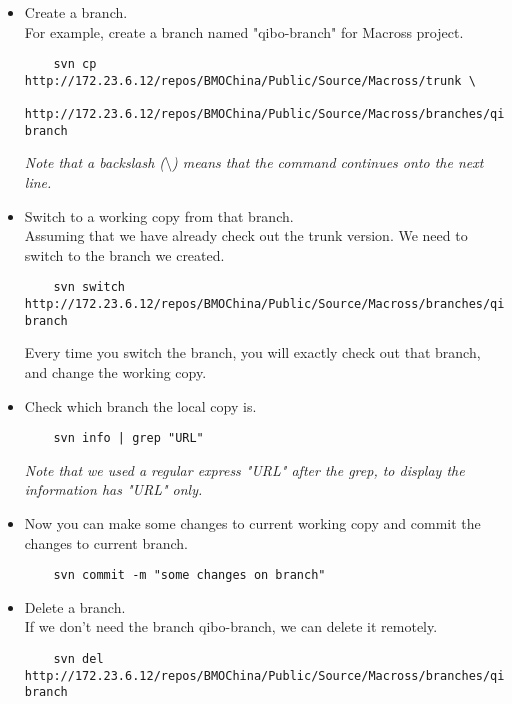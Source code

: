 \begin{itemize}
\item
	Create a branch.\\
	For example, create a branch named "qibo-branch" for Macross project.
	\begin{lstlisting}
	svn cp http://172.23.6.12/repos/BMOChina/Public/Source/Macross/trunk \
	http://172.23.6.12/repos/BMOChina/Public/Source/Macross/branches/qibo-branch
	\end{lstlisting}	
\textit{Note that a backslash ($\setminus$) means that the command continues onto the next line.}	
\item
	Switch to a working copy from that branch. \\ 
	Assuming that we have already check out the trunk version. We need to switch to the branch we created.
	\begin{lstlisting}
	svn switch http://172.23.6.12/repos/BMOChina/Public/Source/Macross/branches/qibo-branch
	\end{lstlisting}	
	Every time you switch the branch, you will exactly check out that branch, and change the working copy.
\item
	Check which branch the local copy is.
	\begin{lstlisting}
	svn info | grep "URL"
	\end{lstlisting}	
\textit{Note that we used a regular express "URL" after the grep, to display the information has "URL" only.}
\item
	Now you can make some changes to current working copy and commit the changes to current branch.
	\begin{lstlisting}
	svn commit -m "some changes on branch"
	\end{lstlisting}	
\item
	Delete a branch. \\ 
	If we don't need the branch qibo-branch, we can delete it remotely.
	\begin{lstlisting}
	svn del http://172.23.6.12/repos/BMOChina/Public/Source/Macross/branches/qibo-branch
	\end{lstlisting}
\end{itemize}


